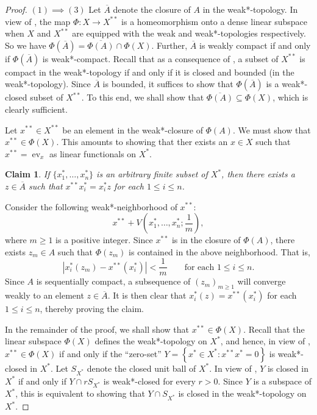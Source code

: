 \documentclass[11pt]{article}
\theoremstyle{thmstyle}
\newtheorem*{claim}{Claim}
\theoremstyle{defstyle}
\newcommand{\ev}{\operatorname{ev}}
\renewcommand{\le}{\leqslant}
\renewcommand{\ge}{\geqslant}
\begin{document}
\begin{proof}
    $\boxed{(1)\implies(3)}$ Let $\overline A$ denote the closure of $A$ in the weak*-topology. In view of , the map $\Phi\colon X\to X^{\ast\ast}$ is a homeomorphism onto a dense linear subspace when $X$ and $X^{\ast\ast}$ are equipped with the weak and weak*-topologies respectively. So we have $\Phi\left(\overline A\right) = \overline{\Phi(A)}\cap\Phi(X)$. Further, $\overline A$ is weakly compact if and only if $\Phi\left(\overline A\right)$ is weak*-compact. Recall that as a consequence of , a subset of $X^{\ast\ast}$ is compact in the weak*-topology if and only if it is closed and bounded (in the weak*-topology). Since $\overline A$ is bounded, it suffices to show that $\Phi(\overline A)$ is a weak*-closed subset of $X^{\ast\ast}$. To this end, we shall show that $\overline{\Phi(A)}\subseteq\Phi(X)$, which is clearly sufficient. 

    Let $x^{\ast\ast}\in X^{\ast\ast}$ be an element in the weak*-closure of $\Phi(A)$. We must show that $x^{\ast\ast}\in\Phi(X)$. This amounts to showing that ther exists an $x\in X$ such that $x^{\ast\ast} = \ev_{x}$ as linear functionals on $X^{\ast}$.

    \begin{claim}
        If $\{x_1^\ast,\dots,x_n^\ast\}$ is an arbitrary finite subset of $X^\ast$, then there exists a $z\in\overline A$ such that $x^{\ast\ast}x_i^\ast = x_i^\ast z$ for each $1\le i\le n$.
    \end{claim}
    Consider the following weak*-neighborhood of $x^{\ast\ast}$:
    \begin{equation*}
        x^{\ast\ast} + V\left(x_1^\ast,\dots, x_n^\ast; \frac{1}{m}\right),
    \end{equation*}
    where $m\ge 1$ is a positive integer. Since $x^{\ast\ast}$ is in the closure of $\Phi(A)$, there exists $z_m\in A$ such that $\Phi(z_m)$ is contained in the above neighborhood. That is, 
    \begin{equation*}
        \left|x_i^\ast(z_m) - x^{\ast\ast}(x_i^\ast)\right| < \frac{1}{m}\qquad\text{for each }1\le i\le n.
    \end{equation*}
    Since $A$ is sequentially compact, a subsequence of $(z_m)_{m\ge 1}$ will converge weakly to an element $z\in\overline A$. It is then clear that $x_i^\ast(z) = x^{\ast\ast}(x_i^\ast)$ for each $1\le i\le n$, thereby proving the claim.

    In the remainder of the proof, we shall show that $x^{\ast\ast}\in\Phi(X)$. Recall that the linear subspace $\Phi(X)$ defines the weak*-topology on $X^\ast$, and hence, in view of , $x^{\ast\ast}\in\Phi(X)$ if and only if the ``zero-set'' $Y = \left\{x^{\ast}\in X^{\ast}\colon x^{\ast\ast}x^\ast = 0\right\}$ is weak*-closed in $X^\ast$. Let $S_{X^\ast}$ denote the closed unit ball of $X^{\ast}$. In view of , $Y$ is closed in $X^{\ast}$ if and only if $Y\cap rS_{X^\ast}$ is weak*-closed for every $r > 0$. Since $Y$ is a subspace of $X^\ast$, this is equivalent to showing that $Y\cap S_{X^\ast}$ is closed in the weak*-topology on $X^\ast$.


\end{proof}
\end{document}
